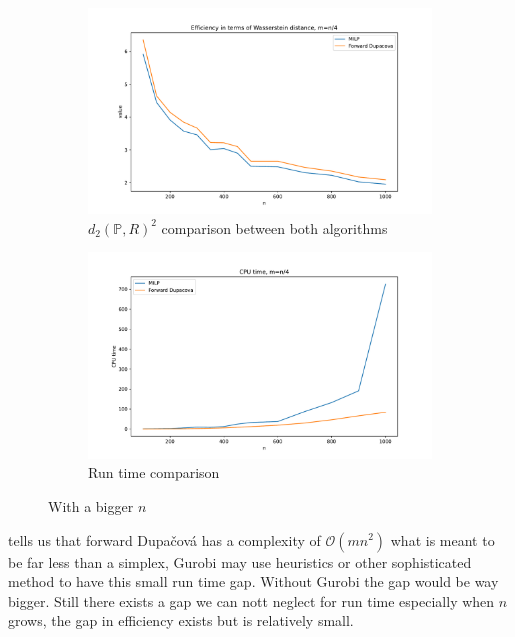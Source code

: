 \documentclass{amsart}
\begin{document}
\begin{figure}[ht]
    \centering
    \begin{subfigure}[b]{0.45\textwidth}
        \centering
        \includegraphics[width=\textwidth]{plots/milp efficiency n4.pdf}
        \caption{$d_2\left(\mathbb{P},R\right)^2$ comparison between both algorithms}
        \label{n4 effi}
    \end{subfigure}
    \hfill
    \begin{subfigure}[b]{0.45\textwidth}
        \centering
        \includegraphics[width=\textwidth]{plots/run time comparison n4.pdf}
        \caption{Run time comparison}
        \label{n4 time}
    \end{subfigure}
    \caption{With a bigger $n$}
    \label{comparison n4}
\end{figure}

 tells us that forward Dupačová has a complexity of $\mathcal{O}\left(mn^2\right)$ what is meant to be far less than a simplex, Gurobi may use heuristics or other sophisticated method to have this small run time gap. Without Gurobi the gap would be way bigger. Still there exists a gap we can nott neglect for run time especially when $n$ grows, the gap in efficiency exists but is relatively small.
\end{document}
